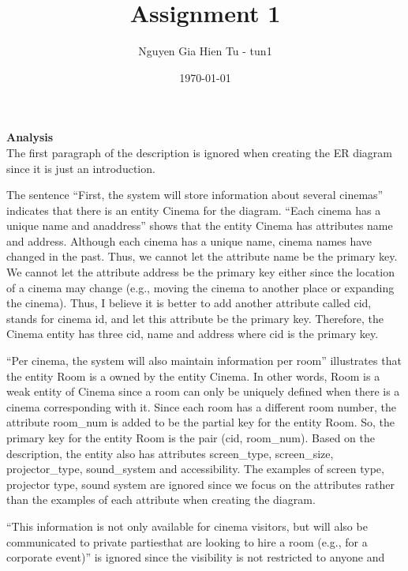 \documentclass{article}
\title{Assignment 1}
\author{Nguyen Gia Hien Tu - tun1}
\date{\today}
\begin{document}
\maketitle

\textbf{Analysis} \\

The first paragraph of the description is ignored when creating the ER diagram
since it is just an introduction.

The sentence ``First, the system will store information about several cinemas''
indicates that there is an entity Cinema for the diagram. ``Each cinema has
a unique name and anaddress'' shows that the entity Cinema has attributes name
and address. Although each cinema has a unique name, cinema names have changed
in the past. Thus, we cannot let the attribute name be the primary key. We cannot
let the attribute address be the primary key either since the location of a
cinema may change (e.g., moving the cinema to another place or expanding the
cinema). Thus, I believe it is better to add another attribute called cid, stands
for cinema id, and let this attribute be the primary key. Therefore, the Cinema
entity has three cid, name and address where cid is the primary key.

``Per cinema, the system will also maintain information per room'' illustrates
that the entity Room is a owned by the entity Cinema. In other words, Room is a
weak entity of Cinema since a room can only be uniquely defined when there is a
cinema corresponding with it. Since each room has a different room number, the
attribute room\_num is added to be the partial key for the entity Room. So, the
primary key for the entity Room is the pair (cid, room\_num). Based on the 
description, the entity also has attributes screen\_type, screen\_size,
projector\_type, sound\_system and accessibility. The examples of screen type,
projector type, sound system are ignored since we focus on the attributes rather
than the examples of each attribute when creating the diagram.

``This information is not only available for cinema visitors, but will also be
communicated to private partiesthat are looking to hire a room (e.g., for a
corporate event)'' is ignored since the visibility is not restricted to anyone
and 

 
\end{document}
